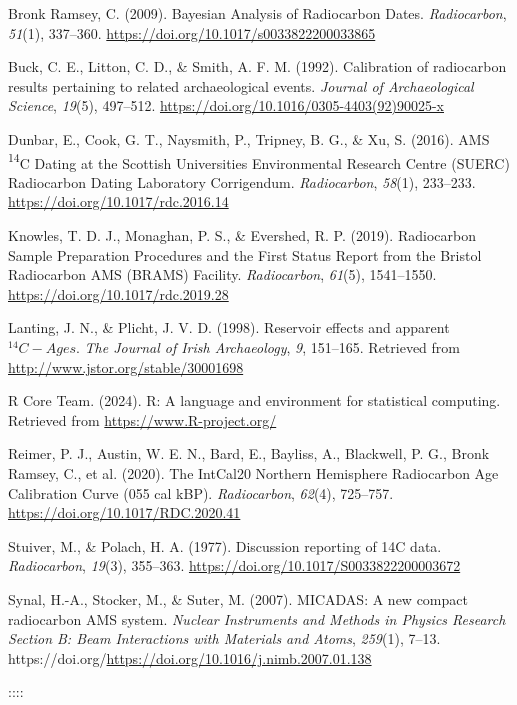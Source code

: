 \documentclass[
]{agujournal2019}
\newlength{\cslhangindent}
\newenvironment{CSLReferences}[2] %
 {\begin{list}{}{%
  \setlength{\itemindent}{0pt}
  \setlength{\leftmargin}{0pt}
  \setlength{\parsep}{0pt}
  \ifodd #1
   \setlength{\leftmargin}{\cslhangindent}
   \setlength{\itemindent}{-1\cslhangindent}
  \fi
  \setlength{\itemsep}{#2\baselineskip}}}
 {\end{list}}
\begin{document}
\label{refs}
\begin{CSLReferences}{1}{0}
\vspace{1em}

Bronk Ramsey, C. (2009). Bayesian Analysis of Radiocarbon Dates.
\emph{Radiocarbon}, \emph{51}(1), 337--360.
\url{https://doi.org/10.1017/s0033822200033865}

Buck, C. E., Litton, C. D., \& Smith, A. F. M. (1992). Calibration of
radiocarbon results pertaining to related archaeological events.
\emph{Journal of Archaeological Science}, \emph{19}(5), 497--512.
\url{https://doi.org/10.1016/0305-4403(92)90025-x}

Dunbar, E., Cook, G. T., Naysmith, P., Tripney, B. G., \& Xu, S. (2016).
AMS {\textsuperscript{14}}C Dating at the Scottish Universities
Environmental Research Centre (SUERC) Radiocarbon Dating Laboratory
{\textendash} Corrigendum. \emph{Radiocarbon}, \emph{58}(1), 233--233.
\url{https://doi.org/10.1017/rdc.2016.14}

Knowles, T. D. J., Monaghan, P. S., \& Evershed, R. P. (2019).
Radiocarbon Sample Preparation Procedures and the First Status Report
from the Bristol Radiocarbon AMS (BRAMS) Facility. \emph{Radiocarbon},
\emph{61}(5), 1541--1550. \url{https://doi.org/10.1017/rdc.2019.28}

Lanting, J. N., \& Plicht, J. V. D. (1998). Reservoir effects and
apparent \(^{14}C-Ages\). \emph{The Journal of Irish Archaeology},
\emph{9}, 151--165. Retrieved from
\url{http://www.jstor.org/stable/30001698}

R Core Team. (2024). R: A language and environment for statistical
computing. Retrieved from \url{https://www.R-project.org/}

Reimer, P. J., Austin, W. E. N., Bard, E., Bayliss, A., Blackwell, P.
G., Bronk Ramsey, C., et al. (2020). The IntCal20 Northern Hemisphere
Radiocarbon Age Calibration Curve (0{\textendash}55 cal kBP).
\emph{Radiocarbon}, \emph{62}(4), 725--757.
\url{https://doi.org/10.1017/RDC.2020.41}

Stuiver, M., \& Polach, H. A. (1977). Discussion reporting of 14C data.
\emph{Radiocarbon}, \emph{19}(3), 355--363.
\url{https://doi.org/10.1017/S0033822200003672}

Synal, H.-A., Stocker, M., \& Suter, M. (2007). MICADAS: A new compact
radiocarbon AMS system. \emph{Nuclear Instruments and Methods in Physics
Research Section B: Beam Interactions with Materials and Atoms},
\emph{259}(1), 7--13.
https://doi.org/\url{https://doi.org/10.1016/j.nimb.2007.01.138}

\end{CSLReferences}

::::
\end{document}
